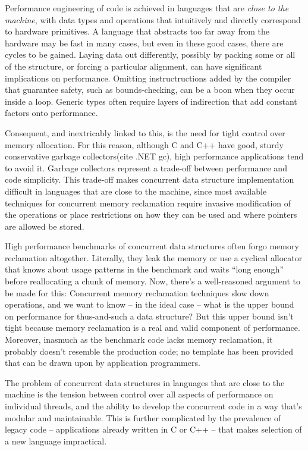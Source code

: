 Performance engineering of code is achieved in languages that are \textit{close to the machine},\cite{Ritchie} with data types and operations that intuitively and directly correspond to hardware primitives.  A language that abstracts too far away from the hardware may be fast in many cases, but even in these good cases, there are cycles to be gained.  Laying data out differently, possibly by packing some or all of the structure, or forcing a particular alignment, can have significant implications on performance.  Omitting instructructions added by the compiler that guarantee safety, such as bounds-checking, can be a boon when they occur inside a loop.  Generic types often require layers of indirection that add constant factors onto performance.

Consequent, and inextricably linked to this, is the need for tight control over memory allocation.  For this reason, although C and C++ have good, sturdy conservative garbage collectors\cite{BDW}(cite .NET gc), high performance applications tend to avoid it.  Garbage collectors represent a trade-off between performance and code simplicity.  This trade-off makes concurrent data structure implementation difficult in languages that are close to the machine, since most available techniques for concurrent memory reclamation require invasive modification of the operations or place restrictions on how they can be used and where pointers are allowed be stored.\cite{HP}\cite{DTA}\cite{StackTrack}\cite{Threadscan}

High performance benchmarks of concurrent data structures often forgo memory reclamation altogether.\cite{Synchrobench}\cite{Scal}  Literally, they leak the memory or use a cyclical allocator that knows about usage patterns in the benchmark and waits ``long enough'' before reallocating a chunk of memory.  Now, there's a well-reasoned argument to be made for this: Concurrent memory reclamation techniques slow down operations, and we want to know -- in the ideal case -- what is the upper bound on performance for thus-and-such a data structure?  But this upper bound isn't tight because memory reclamation is a real and valid component of performance.  Moreover, inasmuch as the benchmark code lacks memory reclamation, it probably doesn't resemble the production code; no template has been provided that can be drawn upon by application programmers.

The problem of concurrent data structures in languages that are close to the machine is the tension between control over all aspects of performance on individual threads, and the ability to develop the concurrent code in a way that's modular and maintainable.  This is further complicated by the prevalence of legacy code -- applications already written in C or C++ -- that makes selection of a new language impractical.

